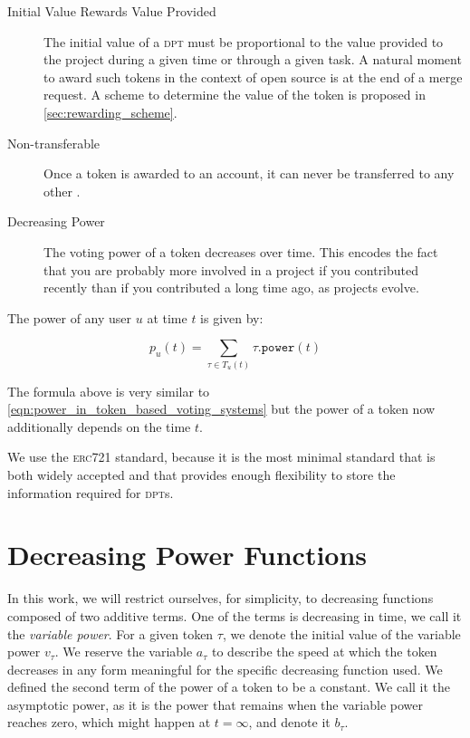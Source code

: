\begin{description}
  \item[Initial Value Rewards Value Provided]
    The initial value of a \textsc{dpt} must be proportional to the value provided to the project during a given time or through a given task.
    A natural moment to award such tokens in the context of open source is at the end of a merge request.
    A scheme to determine the value of the token is proposed in \cref{sec:rewarding_scheme}.
  \item[Non-transferable]
    Once a token is awarded to an account, it can never be transferred to any other%
    .
  \item[Decreasing Power]
  	The voting power of a token decreases over time.
  	This encodes the fact that you are probably more involved in a project if you contributed recently than if you contributed a long time ago, as projects evolve.
\end{description}

The power of any user $u$ at time $t$ is given by:

\begin{equation}
  \label{eqn:power_of_user_with_decreasing_erc721}
  p_u(t) = \sum_{\tau\in T_u(t)}\tau\mathtt{.power}(t)
\end{equation}

The formula above is very similar to \cref{eqn:power_in_token_based_voting_systems} but the power of a token now additionally depends on the time $t$.

We use the \textsc{erc721} standard, because it is the most minimal standard that is both widely accepted and that provides enough flexibility to store the information required for \textsc{dpt}s.

\section{Decreasing Power Functions}

In this work, we will restrict ourselves, for simplicity, to decreasing functions composed of two additive terms.
One of the terms is decreasing in time, we call it the \emph{variable power}.
For a given token $\tau$, we denote the initial value of the variable power $v_\tau$.
We reserve the variable $a_\tau$ to describe the speed at which the token decreases in any form meaningful for the specific decreasing function used.
We defined the second term of the power of a token to be a constant.
We call it the asymptotic power, as it is the power that remains when the variable power reaches zero, which might happen at $t=\infty$, and denote it $b_\tau$.

